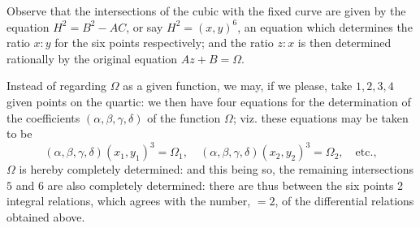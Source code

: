 \documentclass[11pt,a4paper]{book}
\begin{document}
\begin{art}
Observe that the intersections of the cubic with the fixed curve are given by the equation $H^2 = B^2 - AC$, or say $H^2 = (x,y)^6$, an equation which determines the ratio $x:y$ for the six points respectively; and the ratio $z:x$ is then determined rationally by the original equation $Az + B = \Omega$.

Instead of regarding $\Omega$ as a given function, we may, if we please, take $1,2,3,4$ given points on the quartic: we then have four equations for the determination of the coefficients $(\alpha,\beta,\gamma,\delta)$ of the function $\Omega$; viz. these equations may be taken to be
\[
(\alpha,\beta,\gamma,\delta)(x_1,y_1)^3 = \Omega_1, \quad (\alpha,\beta,\gamma,\delta)(x_2,y_2)^3 = \Omega_2, \quad \text{etc.},
\]
$\Omega$ is hereby completely determined: and this being so, the remaining intersections $5$ and $6$ are also completely determined: there are thus between the six points 2 integral relations, which agrees with the number, $=2$, of the differential relations obtained above.
\end{art}
\end{document}
